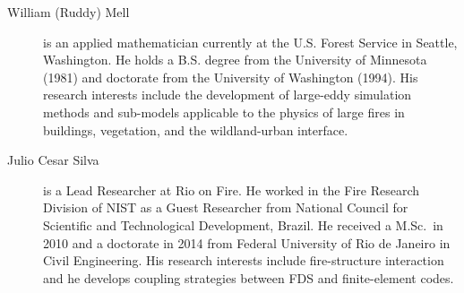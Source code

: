 \begin{description}
\item[William (Ruddy) Mell] is an applied mathematician currently at the U.S. Forest Service in Seattle, Washington. He holds a B.S. degree from the University of Minnesota (1981) and doctorate from the University of Washington (1994). His research interests include the development of large-eddy simulation methods and sub-models applicable to the physics of large fires in buildings, vegetation, and the wildland-urban interface.




\item[Julio Cesar Silva] is a Lead Researcher at Rio on Fire. He worked in the Fire Research Division of NIST as a Guest Researcher from National Council for Scientific and Technological Development, Brazil. He received a M.Sc.~in 2010 and a doctorate in 2014 from Federal University of Rio de Janeiro in Civil Engineering. His research interests include fire-structure interaction and he develops coupling strategies between FDS and finite-element codes.


\end{description}
